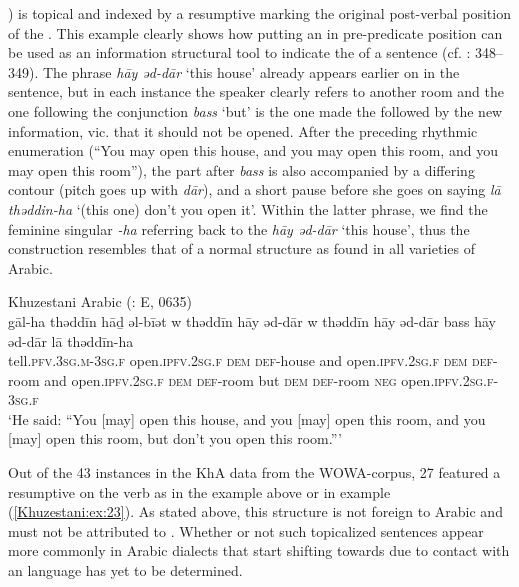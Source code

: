 \documentclass[output=paper,colorlinks,citecolor=brown,draftmode]{langscibook}
\begin{document}
{}) is topical and indexed by a resumptive  marking the original post-verbal position of the . This example clearly shows how putting an  in pre-predicate position can be used as an information structural tool to indicate the  of a sentence (cf. \citealt{brustad2000}: 348--349). The phrase \textit{hāy əd-dār} `this house' already appears earlier on in the sentence, but in each instance the speaker clearly refers to another room and the one following the conjunction \textit{bass} `but' is the one made the  followed by the new information, vic. that it should not be opened. After the preceding rhythmic enumeration (``You may open this house, and you may open this room, and you may open this room''), the part after \textit{bass} is also accompanied by a differing  contour (pitch goes up with \textit{dār}), and a short pause before she goes on saying \textit{lā thəddin-ha} `(this one) don't you open it'. Within the latter phrase, we find the feminine singular   \textit{-ha} referring back to the  \textit{hāy əd-dār} `this house', thus the construction resembles that of a normal  structure as found in all varieties of Arabic.

\ea\label{Khuzestani:ex:34}
Khuzestani Arabic (\citealt{leitnerArabic2021}: E, 0635) \\
\gll gāl-ha thəddīn hāḏ əl-bīət w thəddīn hāy əd-dār w thəddīn hāy əd-dār bass hāy əd-dār lā thəddīn-ha \\
tell\textsc{.pfv.3sg.m-3sg.f} open\textsc{.ipfv.2sg.f} \textsc{dem} \textsc{def-}house and open\textsc{.ipfv.2sg.f} \textsc{dem} \textsc{def-}room and open\textsc{.ipfv.2sg.f} \textsc{dem} \textsc{def-}room but \textsc{dem} \textsc{def-}room \textsc{neg} open\textsc{.ipfv.2sg.f-3sg.f} \\
\glt `He said: ``You [may] open this house, and you [may] open this room, and you [may] open this room, but don't you open this room.''' 
\z

Out of the 43  instances in the KhA data from the WOWA-corpus, 27 featured a resumptive  on the verb as in the example above or in example (\ref{Khuzestani:ex:23}). As stated above, this structure is not foreign to Arabic and must not be attributed to . Whether or not such topicalized sentences appear more commonly in Arabic dialects that start shifting towards  due to contact with an  language has yet to be determined.
\end{document}
